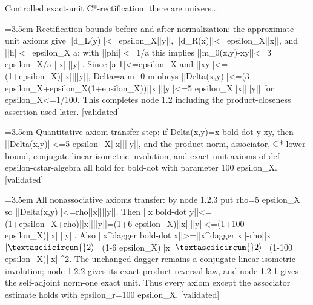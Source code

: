 \documentclass{article}
\newcommand{\step}[1]{\par\noindent\hangindent=3.5em\hangafter=1%
  \makebox[3.5em][l]{\textbf{#1.}}}
\newcommand{\steptag}[1]{\hfill{\small\textsf{[#1]}}}
\begin{document}
\begin{proofbox}{Controlled exact-unit C*-rectification: there are univers...}
\step{1.2.3} Rectification bounds before and after normalization: the approximate-unit axioms give ||d\_L(y)||<=epsilon\_X||y||, ||d\_R(x)||<=epsilon\_X||x||, and ||h||<=epsilon\_X a; with ||phi||<=1/a this implies ||m\_0(x,y)-xy||<=3 epsilon\_X/a ||x||||y||. Since |a-1|<=epsilon\_X and ||xy||<=(1+epsilon\_X)||x||||y||, Delta=a m\_0-m obeys ||Delta(x,y)||<=(3 epsilon\_X+epsilon\_X(1+epsilon\_X))||x||||y||<=5 epsilon\_X||x||||y|| for epsilon\_X<=1/100. This completes node 1.2 including the product-closeness assertion used later. \steptag{validated} \\[4pt]
\step{1.3} Quantitative axiom-transfer step: if Delta(x,y)=x bold-dot y-xy, then ||Delta(x,y)||<=5 epsilon\_X||x||||y||, and the product-norm, associator, C*-lower-bound, conjugate-linear isometric involution, and exact-unit axioms of def-epsilon-cstar-algebra all hold for bold-dot with parameter 100 epsilon\_X. \steptag{validated} \\[6pt]
\step{1.3.1} All nonassociative axioms transfer: by node 1.2.3 put rho=5 epsilon\_X so ||Delta(x,y)||<=rho||x||||y||. Then ||x bold-dot y||<= (1+epsilon\_X+rho)||x||||y||=(1+6 epsilon\_X)||x||||y||<=(1+100 epsilon\_X)||x||||y||. Also ||x\textasciicircum{}dagger bold-dot x||>=||x\textasciicircum{}dagger x||-rho||x|$|\textasciicircum{}2\rangle$=(1-6 epsilon\_X)||x|$|\textasciicircum{}2\rangle$=(1-100 epsilon\_X)||x||\textasciicircum{}2. The unchanged dagger remains a conjugate-linear isometric involution; node 1.2.2 gives its exact product-reversal law, and node 1.2.1 gives the self-adjoint norm-one exact unit. Thus every axiom except the associator estimate holds with epsilon\_r=100 epsilon\_X. \steptag{validated} \\[6pt]

\end{proofbox}
\end{document}
